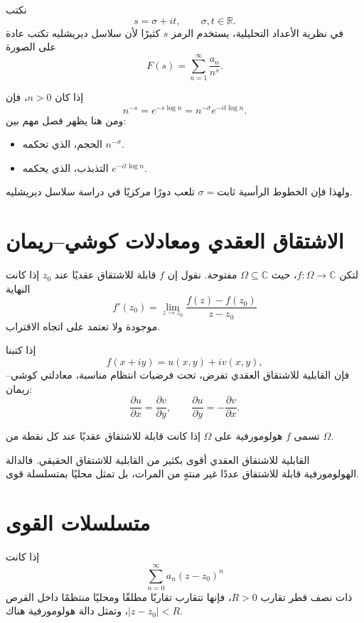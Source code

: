 نكتب
\[
s=\sigma+it,
\qquad \sigma,t\in\mathbb{R}.
\]
في نظرية الأعداد التحليلية، يستخدم الرمز \(s\) كثيرًا لأن سلاسل ديريشليه تكتب عادة على الصورة
\[
F(s)=\sum_{n=1}^{\infty}\frac{a_n}{n^s}.
\]

إذا كان \(n>0\)، فإن
\[
n^{-s}=e^{-s\log n}=n^{-\sigma}e^{-it\log n}.
\]
ومن هنا يظهر فصل مهم بين:

\begin{itemize}
  \item الحجم، الذي تحكمه \(n^{-\sigma}\).
  \item التذبذب، الذي يحكمه \(e^{-it\log n}\).
\end{itemize}

ولهذا فإن الخطوط الرأسية \(\sigma=\text{ثابت}\) تلعب دورًا مركزيًا في دراسة سلاسل ديريشليه.

\section{الاشتقاق العقدي ومعادلات كوشي--ريمان}

لتكن \(f:\Omega\to\mathbb{C}\)، حيث \(\Omega\subseteq\mathbb{C}\) مفتوحة. نقول إن \(f\) قابلة للاشتقاق عقديًا عند \(z_0\) إذا كانت النهاية
\[
f'(z_0)=\lim_{z\to z_0}\frac{f(z)-f(z_0)}{z-z_0}
\]
موجودة ولا تعتمد على اتجاه الاقتراب.

إذا كتبنا
\[
f(x+iy)=u(x,y)+iv(x,y),
\]
فإن القابلية للاشتقاق العقدي تفرض، تحت فرضيات انتظام مناسبة، معادلتي كوشي--ريمان:
\[
\frac{\partial u}{\partial x}
=
\frac{\partial v}{\partial y},
\qquad
\frac{\partial u}{\partial y}
=
-\frac{\partial v}{\partial x}.
\]

\begin{definition}
تسمى \(f\) هولومورفية على \(\Omega\) إذا كانت قابلة للاشتقاق عقديًا عند كل نقطة من \(\Omega\).
\end{definition}

القابلية للاشتقاق العقدي أقوى بكثير من القابلية للاشتقاق الحقيقي. فالدالة الهولومورفية قابلة للاشتقاق عددًا غير منتهٍ من المرات، بل تمثل محليًا بمتسلسلة قوى.

\section{متسلسلات القوى}

إذا كانت
\[
\sum_{n=0}^{\infty}a_n(z-z_0)^n
\]
ذات نصف قطر تقارب \(R>0\)، فإنها تتقارب تقاربًا مطلقًا ومحليًا منتظمًا داخل القرص \(|z-z_0|<R\)، وتمثل دالة هولومورفية هناك.

